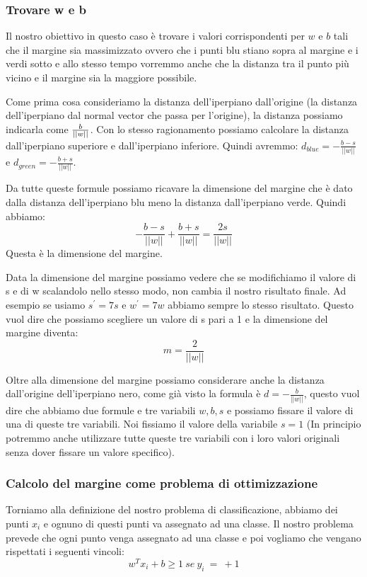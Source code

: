 \documentclass[14pt]{extreport}
\begin{document}
\subsubsection{Trovare w e b}

Il nostro obiettivo in questo caso è trovare i valori corrispondenti per $w$ e $b$ tali che il margine sia massimizzato ovvero che i punti blu stiano
sopra al margine e i verdi sotto e allo stesso tempo vorremmo anche che la distanza tra il punto più vicino e il margine sia la maggiore possibile.

Come prima cosa consideriamo la distanza dell'iperpiano dall'origine (la distanza dell'iperpiano dal normal vector che passa per l'origine), la
distanza possiamo indicarla come $\-\frac{b}{||w||}$. Con lo stesso ragionamento possiamo calcolare la distanza dall'iperpiano superiore e
dall'iperpiano inferiore. Quindi avremmo: $d_{blue} = -\frac{b-s}{||w||}$ e $d_{green} = -\frac{b+s}{||w||}$.

Da tutte queste formule possiamo ricavare la dimensione del margine che è dato dalla distanza dell'iperpiano blu meno la distanza dall'iperpiano
verde. Quindi abbiamo:
$$-\frac{b-s}{||w||} + \frac{b+s}{||w||} = \frac{2s}{||w||}$$ Questa è la dimensione del margine.

Data la dimensione del margine possiamo vedere che se modifichiamo il valore di s e di w scalandolo nello stesso modo, non cambia il nostro risultato
finale. Ad esempio se usiamo $s^{'}=7s$ e $w^{'} = 7w$ abbiamo sempre lo stesso risultato. Questo vuol dire che possiamo scegliere un valore di s pari
a 1 e la dimensione del margine diventa: $$m = \frac{2}{||w||}$$

Oltre alla dimensione del margine possiamo considerare anche la distanza dall'origine dell'iperpiano nero, come già visto la formula è $d =
-\frac{b}{||w||}$, questo vuol dire che abbiamo due formule e tre variabili $w, b, s$ e possiamo fissare il valore di una di queste tre variabili. Noi
fissiamo il valore della variabile $s=1$ (In principio potremmo anche utilizzare tutte queste tre variabili con i loro valori originali senza dover
fissare un valore specifico).

\subsubsection{Calcolo del margine come problema di ottimizzazione}

Torniamo alla definizione del nostro problema di classificazione, abbiamo dei punti $x_i$ e ognuno di questi punti va assegnato ad una classe. Il
nostro problema prevede che ogni punto venga assegnato ad una classe e poi vogliamo che vengano rispettati i seguenti vincoli: $$w^Tx_i+b \geq 1 \ se\
y_i\ =\ +1$$  
\end{document}
